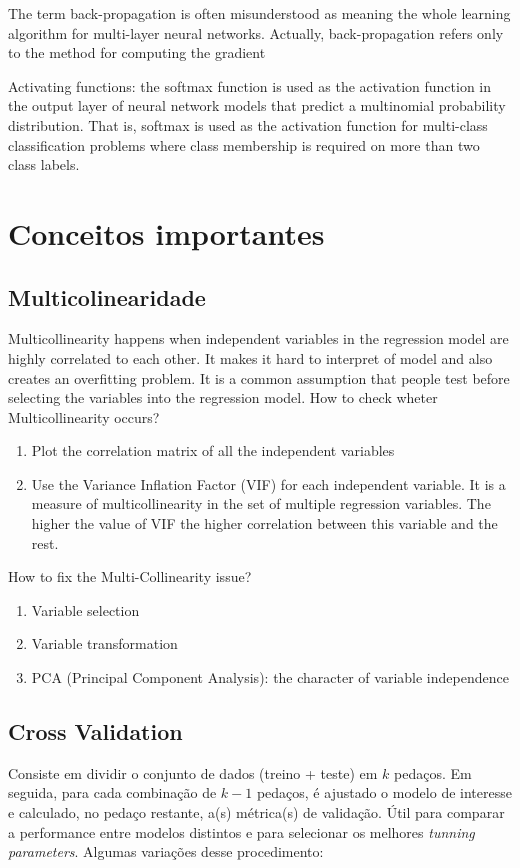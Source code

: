 The term back-propagation is often misunderstood as meaning the whole
learning algorithm for multi-layer neural networks. Actually, back-propagation refers only to the method for computing the gradient

Activating functions: the softmax function is used as the activation function in the output layer of neural network models that predict a multinomial probability distribution. That is, softmax is used as the activation function for multi-class classification problems where class membership is required on more than two class labels.

\section{Conceitos importantes}

\subsection{Multicolinearidade}
Multicollinearity happens when independent variables in the regression model are highly correlated to each other. It makes it hard to interpret of model and also creates an overfitting problem. It is a common assumption that people test before selecting the variables into the regression model. How to check wheter Multicollinearity occurs?

\begin{enumerate}
    \item Plot the correlation matrix of all the independent variables
    \item Use the Variance Inflation Factor (VIF) for each independent variable. It is a measure of multicollinearity in the set of multiple regression variables. The higher the value of VIF the higher correlation between this variable and the rest.
\end{enumerate}

How to fix the Multi-Collinearity issue?
\begin{enumerate}
    \item Variable selection
    \item Variable transformation
    \item PCA (Principal Component Analysis): the character of variable independence
\end{enumerate}

\subsection{Cross Validation}
Consiste em dividir o conjunto de dados (treino + teste) em $k$ pedaços. Em seguida, para cada combinação de $k-1$ pedaços, é ajustado o modelo de interesse e calculado, no pedaço restante, a(s) métrica(s) de validação. Útil para comparar a performance entre modelos distintos e para selecionar os melhores  \textit{tunning parameters}. Algumas variações desse procedimento:

